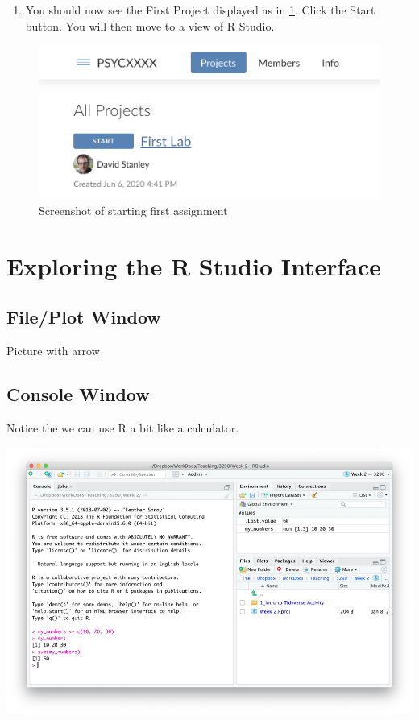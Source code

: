 \documentclass[
]{krantz}
\providecommand{\tightlist}{%
  \setlength{\itemsep}{0pt}\setlength{\parskip}{0pt}}
\begin{document}
\begin{enumerate}
\def\labelenumi{\arabic{enumi}.}
\setcounter{enumi}{4}
\tightlist
\item
  You should now see the First Project displayed as in \ref{fig:assignment}. Click the Start button. You will then move to a view of R Studio.
\end{enumerate}

\begin{figure}
\includegraphics[width=0.85\linewidth]{first_time/images/screenshot_assignment} \caption{Screenshot of starting first assignment}\label{fig:assignment}
\end{figure}

\hypertarget{exploring-the-r-studio-interface}{%
\section{Exploring the R Studio Interface}\label{exploring-the-r-studio-interface}}

\hypertarget{fileplot-window}{%
\subsection{File/Plot Window}\label{fileplot-window}}

Picture with arrow

\hypertarget{console-window}{%
\subsection{Console Window}\label{console-window}}

Notice the we can use R a bit like a calculator.

\includegraphics[width=1\linewidth]{first_time/images/console}
\end{document}
